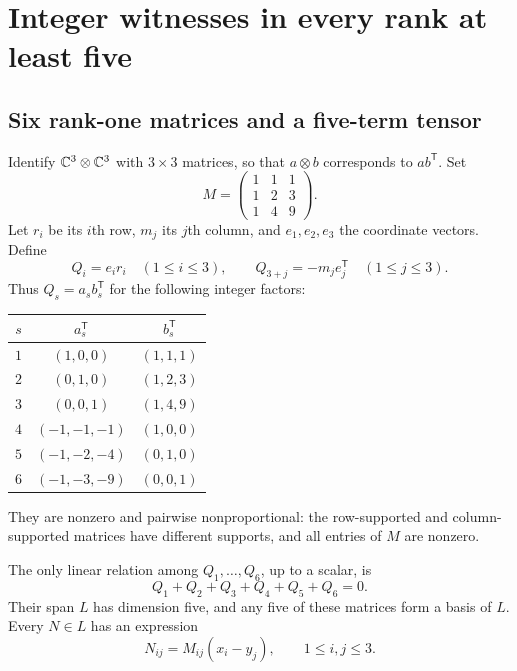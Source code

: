 \section{Integer witnesses in every rank at least five}\label{sec:witness}
\subsection{Six rank-one matrices and a five-term tensor}

Identify $\mathbb C^3\otimes\mathbb C^3$ with $3\times3$ matrices, so that
$a\otimes b$ corresponds to $ab^{\mathsf T}$. Set
\begin{equation}\label{eq:M}
 M=\begin{pmatrix}1&1&1\\1&2&3\\1&4&9\end{pmatrix}.
\end{equation}
Let $r_i$ be its $i$th row, $m_j$ its $j$th column, and
$e_1,e_2,e_3$ the coordinate vectors. Define
\begin{equation}\label{eq:Q}
 Q_i=e_i r_i\quad(1\leq i\leq3),\qquad
 Q_{3+j}=-m_j e_j^{\mathsf T}\quad(1\leq j\leq3).
\end{equation}
Thus $Q_s=a_s b_s^{\mathsf T}$ for the following integer factors:
\begin{center}
\begin{tabular}{c@{\qquad}c@{\qquad}c}
\toprule
$s$&$a_s^{\mathsf T}$&$b_s^{\mathsf T}$\\
\midrule
$1$&$(1,0,0)$&$(1,1,1)$\\
$2$&$(0,1,0)$&$(1,2,3)$\\
$3$&$(0,0,1)$&$(1,4,9)$\\
$4$&$(-1,-1,-1)$&$(1,0,0)$\\
$5$&$(-1,-2,-4)$&$(0,1,0)$\\
$6$&$(-1,-3,-9)$&$(0,0,1)$\\
\bottomrule
\end{tabular}
\end{center}
They are nonzero and pairwise nonproportional: the row-supported and
column-supported matrices have different supports, and all entries of
$M$ are nonzero.

\begin{lemma}\label{lem:L}\label{lemma:witness-core}
The only linear relation among $Q_1,\ldots,Q_6$, up to a scalar,
is
\begin{equation}\label{eq:Q-relation}
 Q_1+Q_2+Q_3+Q_4+Q_5+Q_6=0.
\end{equation}
Their span $L$ has dimension five, and any five of these matrices form
a basis of $L$. Every $N\in L$ has an expression
\begin{equation}\label{eq:L-coordinates}
 N_{ij}=M_{ij}(x_i-y_j),\qquad 1\leq i,j\leq3.
\end{equation}
\end{lemma}

